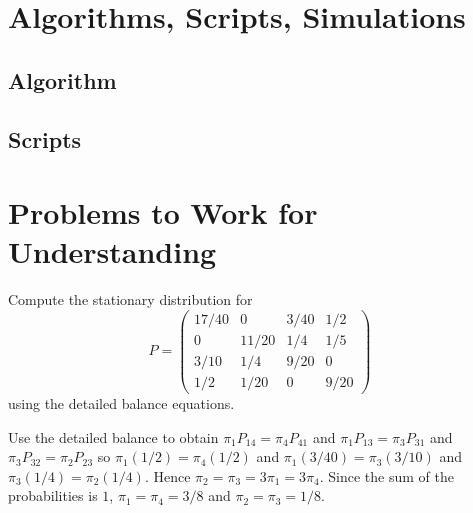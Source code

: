 \documentclass[12pt]{article}
\begin{document}
\section*{Algorithms, Scripts, Simulations}

\subsection*{Algorithm}

\subsection*{Scripts}


\hr

\section*{Problems to Work for Understanding}
\renewcommand{\theexerciseseries}{}
\renewcommand{\theexercise}{\arabic{exercise}}

\begin{exercise}
    Compute the stationary distribution for
    \[
        P =
        \begin{pmatrix}
            17/40       & 0     & 3/40  & 1/2 \\
            0   & 11/20 & 1/4   & 1/5 \\
            3/10        & 1/4   & 9/20  & 0 \\
            1/2 & 1/20  & 0     & 9/20
        \end{pmatrix}
    \] using the detailed balance equations.
\end{exercise}
\begin{solution}
    Use the detailed balance to obtain \( \pi_1P_{14} = \pi_4P_{41} \)
    and \( \pi_1P_{13} = \pi_3P_{31} \) and \( \pi_3P_{32} = \pi_2P_{23}
    \) so \( \pi_1(1/2) = \pi_4(1/2) \) and \( \pi_1(3/40) = \pi_3(3/10)
    \) and \( \pi_3(1/4) = \pi_2(1/4) \). Hence \( \pi_2 = \pi_3 = 3\pi_1
    = 3\pi_4 \).  Since the sum of the probabilities is \( 1 \), \( \pi_1
    = \pi_4 = 3/8 \) and \( \pi_2 = \pi_3 = 1/8 \).
\end{solution}
\end{document}
